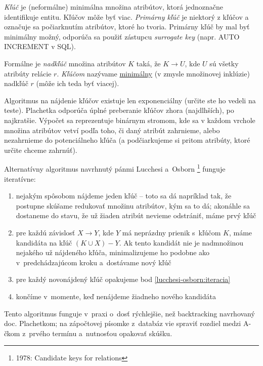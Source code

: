 \documentclass[10pt,a4paper]{article}
\begin{document}
\emph{Kľúč} je (neformálne) minimálna množina atribútov, ktorá
jednoznačne identifikuje entitu. Kľúčov môže byť viac. \emph{Primárny
kľúč} je niektorý z kľúčov a označuje sa počiarknutím atribútov,
ktoré ho tvoria. Primárny kľúč by mal byť minimálny možný, odporúča sa použiť zástupcu \emph{surrogate key} (napr. AUTO INCREMENT v SQL).

Formálne je \emph{nadkľúč} množina atribútov $K$ taká, že $K \rightarrow U$, kde $U$ sú všetky atribúty relácie $r$. \emph{Kľúčom} nazývame \underline{minimálny} (v zmysle množinovej inklúzie) nadkľúč $r$ (môže ich teda byť viacej).

Algoritmus na nájdenie kľúčov existuje len exponenciálny (určite ste ho vedeli na teste). Plachetka odporúča úplné preberanie kľúčov zhora (najdlhších), po najkratšie. Výpočet sa reprezentuje binárnym stromom, kde sa v každom vrchole množina atribútov vetví podľa toho, či  daný atribút zahrnieme, alebo nezahrnieme do potenciálneho kľúča (a podčiarkujeme si pritom atribúty, ktoré určite chceme zahrnúť).

Alternatívny algoritmus navrhnutý pánmi Lucchesi a~Osborn \footnote{1978:
Candidate keys for relations} funguje iteratívne:
\begin{enumerate}
    \item
    nejakým spôsobom nájdeme jeden kľúč -- toto sa dá napríklad tak, že
    postupne skúšame redukovať množinu atribútov, kým sa to dá; akonáhle
    sa dostaneme do stavu, že už žiaden atribút nevieme odstrániť, máme
    prvý kľúč

    \item \label{lucchesi-osborn:iteracia}
    pre každú závislosť $X \to Y$, kde $Y$ má neprázdny prienik s~kľúčom
    $K$, máme kandidáta na kľúč $(K \cup X) - Y$. Ak tento kandidát nie je
    nadmnožinou nejakého už nájdeného kľúča, minimalizujeme ho podobne ako
    v~predchádzajúcom kroku a~dostávame nový kľúč

    \item
    pre každý novonájdený kľúč opakujeme bod
    \ref{lucchesi-osborn:iteracia}

    \item
    končíme v~momente, keď nenájdeme žiadneho nového kandidáta
\end{enumerate}

Tento algoritmus funguje v~praxi o~dosť rýchlejšie, než backtracking
navrhovaný doc. Plachetkom; na zápočtovej písomke z~databáz vie spraviť
rozdiel medzi A-čkom z~prvého termínu a~nutnosťou opakovať skúšku.
\end{document}

